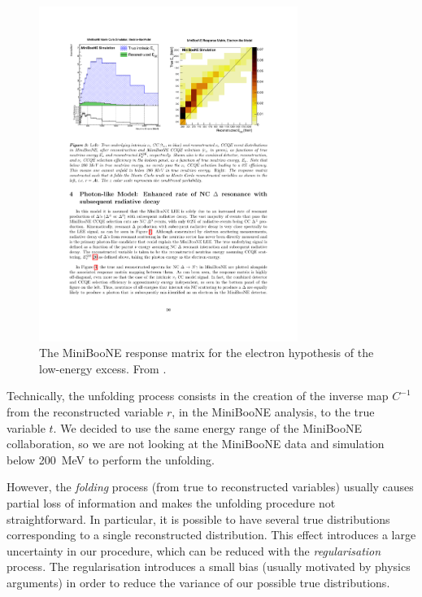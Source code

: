 \begin{figure}[htbp]
\centering
\includegraphics[width=0.75\textwidth]{figures/lee_map.pdf} 
\caption{The MiniBooNE response matrix for the electron hypothesis of the low-energy excess. From \cite{lee_unfolding}.} 
\label{fig:lee_map}
\end{figure}

Technically, the unfolding process consists in the creation of the inverse map $C^{-1}$ from the reconstructed variable $r$, in the MiniBooNE analysis, to the true variable $t$. We decided to use the same energy range of the MiniBooNE collaboration, so we are not looking at the MiniBooNE data and simulation below 200~MeV to perform the unfolding.

However, the \emph{folding} process (from true to reconstructed variables) usually causes partial loss of information and makes the unfolding procedure not straightforward. In particular, it is possible to have several true distributions corresponding to a single reconstructed distribution. This effect introduces a large uncertainty in our procedure, which can be reduced with the \emph{regularisation} process.
The regularisation introduces a small bias (usually motivated by physics arguments) in order to reduce the variance of our possible true distributions. 

